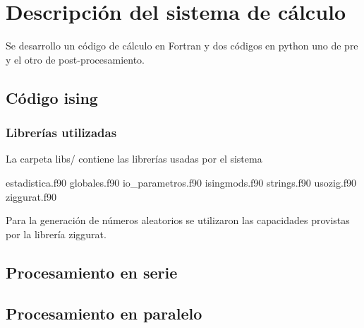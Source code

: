 \section{Descripci\'on del sistema de c\'alculo}


Se desarrollo un c\'odigo de c\'alculo en Fortran y dos c\'odigos
en python uno  de pre y el otro de post-procesamiento.


\subsection{C\'odigo ising}

\subsubsection{Librer\'ias utilizadas}

La carpeta libs/ contiene las librer\'ias usadas por el sistema

estadistica.f90  globales.f90  io_parametros.f90  isingmods.f90  strings.f90  usozig.f90  ziggurat.f90


Para la generaci\'on de n\'umeros aleatorios se utilizaron
las capacidades provistas por la librer\'ia ziggurat. 



\subsection{Procesamiento en serie}

\subsection{Procesamiento en paralelo}
